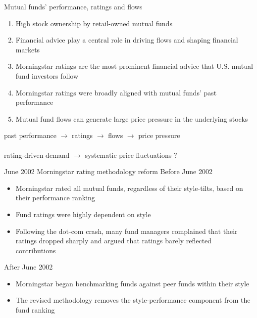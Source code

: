 \documentclass[UTF8, 16pt]{beamer}
\begin{document}
\begin{CJK*}{UTF8}{gbsn}
\begin{frame}{Mutual funds' performance, ratings and flows}
	\begin{enumerate}
		\item High stock ownership by \alert{retail-owned mutual funds}
		\item \alert{Financial advice} play a central role in  \alert{driving flows} and shaping financial markets
		\item \alert{Morningstar ratings} are the most prominent financial advice that U.S. mutual fund investors follow
		\item Morningstar ratings were broadly aligned with mutual funds’ \alert{past performance}
		\item Mutual fund flows can generate large \alert{price pressure} in the underlying stocks
	\end{enumerate}
	\center past performance $\rightarrow$ ratings $\rightarrow$ flows $\rightarrow$ price pressure
	\\\ \\
	rating-driven demand $\rightarrow$ systematic price fluctuations ?
\end{frame}

\begin{frame}{June 2002 Morningstar rating methodology reform}
	\alert{Before} June 2002
	\begin{itemize}
		\item Morningstar rated all mutual funds, \alert{regardless of their style-tilts}, based on their performance ranking
		\item Fund ratings were highly dependent on style
		\item Following the \alert{dot-com crash}, many fund managers complained that their ratings dropped sharply and argued that ratings barely reflected  contributions
	\end{itemize}
	\alert{After} June 2002
	\begin{itemize}
		\item Morningstar began benchmarking funds against peer funds \alert{within their style}
		\item The revised methodology removes the style-performance component from the fund ranking
	\end{itemize}
\end{frame}


\end{CJK*}
\end{document}
